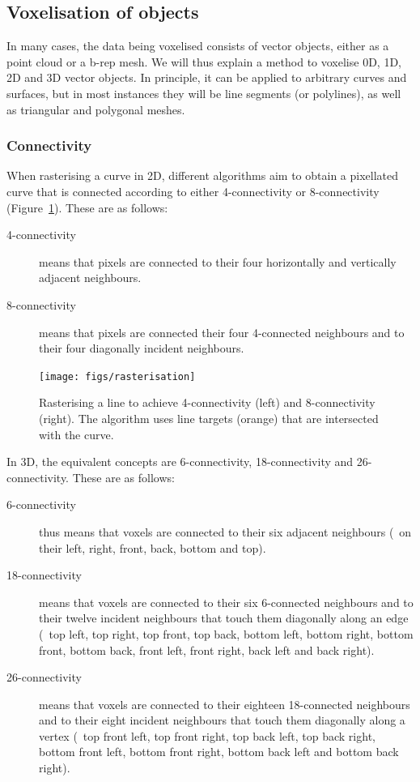 \subsection{Voxelisation of objects}

In many cases, the data being voxelised consists of vector objects, either as a point cloud or a b-rep mesh.
We will thus explain a method to voxelise 0D, 1D, 2D and 3D vector objects.
In principle, it can be applied to arbitrary curves and surfaces, but in most instances they will be line segments (or polylines), as well as triangular and polygonal meshes.

\subsubsection*{Connectivity}

When rasterising a curve in 2D, different algorithms aim to obtain a pixellated curve that is connected according to either 4-connectivity or 8-connectivity (Figure~\ref{fig:rasterisation}).
These are as follows:
\begin{description}
\item[4-connectivity] means that pixels are connected to their four horizontally and vertically adjacent neighbours.
\item[8-connectivity] means that pixels are connected their four 4-connected neighbours and to their four diagonally incident neighbours.
\end{description}

\begin{figure}
\centering
\texttt{[image: figs/rasterisation]}
\caption[Rasterising a line to achieve 4-connectivity and 8-connectivity]{Rasterising a line to achieve 4-connectivity (left) and 8-connectivity (right). The algorithm uses line targets (orange) that are intersected with the curve.}%
\label{fig:rasterisation}
\end{figure}

In 3D, the equivalent concepts are 6-connectivity, 18-connectivity and 26-connectivity.
These are as follows:
\begin{description}
\item[6-connectivity]  thus means that voxels are connected to their six adjacent neighbours (\ie\ on their left, right, front, back, bottom and top).
\item[18-connectivity]  means that voxels are connected to their six 6-connected neighbours and to their twelve incident neighbours that touch them diagonally along an edge (\ie\ top left, top right, top front, top back, bottom left, bottom right, bottom front, bottom back, front left, front right, back left and back right).
\item[26-connectivity]  means that voxels are connected to their eighteen 18-connected neighbours and to their eight incident neighbours that touch them diagonally along a vertex (\ie\ top front left, top front right, top back left, top back right, bottom front left, bottom front right, bottom back left and bottom back right).
\end{description}

